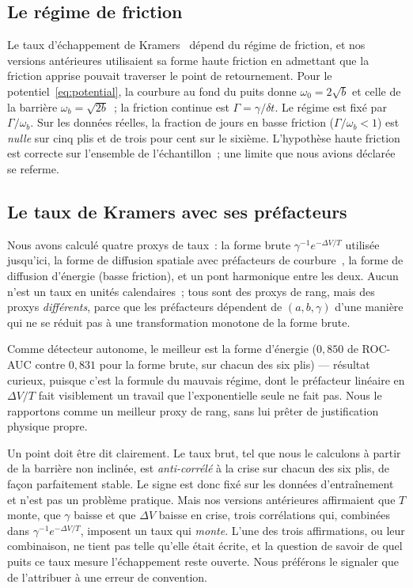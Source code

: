\documentclass[11pt,a4paper]{article}
\newcommand{\dV}{\Delta V}
\begin{document}
\subsection{Le régime de friction}

Le taux d'échappement de Kramers~\cite{kramers1940} dépend du régime de friction, et nos versions antérieures utilisaient sa forme haute friction en admettant que la friction apprise pouvait traverser le point de retournement. Pour le potentiel~\eqref{eq:potential}, la courbure au fond du puits donne $\omega_0 = 2\sqrt b$ et celle de la barrière $\omega_b = \sqrt{2b}$~; la friction continue est $\Gamma = \gamma/\delta t$. Le régime est fixé par $\Gamma/\omega_b$. Sur les données réelles, la fraction de jours en basse friction ($\Gamma/\omega_b < 1$) est \emph{nulle} sur cinq plis et de trois pour cent sur le sixième. L'hypothèse haute friction est correcte sur l'ensemble de l'échantillon~; une limite que nous avions déclarée se referme.

\subsection{Le taux de Kramers avec ses préfacteurs}

Nous avons calculé quatre proxys de taux~: la forme brute $\gamma^{-1}e^{-\dV/T}$ utilisée jusqu'ici, la forme de diffusion spatiale avec préfacteurs de courbure~\cite{hanggi1990}, la forme de diffusion d'énergie (basse friction), et un pont harmonique entre les deux. Aucun n'est un taux en unités calendaires~; tous sont des proxys de rang, mais des proxys \emph{différents}, parce que les préfacteurs dépendent de $(a,b,\gamma)$ d'une manière qui ne se réduit pas à une transformation monotone de la forme brute.

Comme détecteur autonome, le meilleur est la forme d'énergie ($0{,}850$ de ROC-AUC contre $0{,}831$ pour la forme brute, sur chacun des six plis) --- résultat curieux, puisque c'est la formule du mauvais régime, dont le préfacteur linéaire en $\dV/T$ fait visiblement un travail que l'exponentielle seule ne fait pas. Nous le rapportons comme un meilleur proxy de rang, sans lui prêter de justification physique propre.

Un point doit être dit clairement. Le taux brut, tel que nous le calculons à partir de la barrière non inclinée, est \emph{anti-corrélé} à la crise sur chacun des six plis, de façon parfaitement stable. Le signe est donc fixé sur les données d'entraînement et n'est pas un problème pratique. Mais nos versions antérieures affirmaient que $T$ monte, que $\gamma$ baisse et que $\dV$ baisse en crise, trois corrélations qui, combinées dans $\gamma^{-1}e^{-\dV/T}$, imposent un taux qui \emph{monte}. L'une des trois affirmations, ou leur combinaison, ne tient pas telle qu'elle était écrite, et la question de savoir de quel puits ce taux mesure l'échappement reste ouverte. Nous préférons le signaler que de l'attribuer à une erreur de convention.
\end{document}
